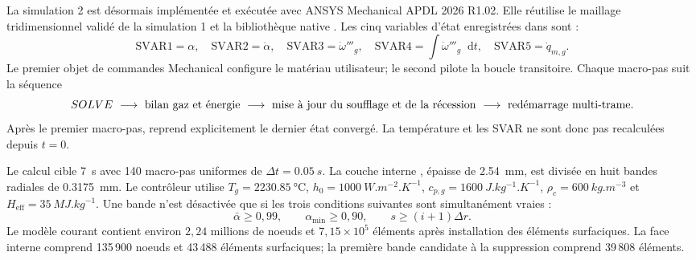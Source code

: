 \documentclass[oneside,openany]{amsdtx}
\newcommand{\dd}{\mathop{}\!\mathrm{d}}
\begin{document}
La simulation 2 est désormais implémentée et exécutée avec ANSYS Mechanical
APDL 2026 R1.02. Elle réutilise le maillage tridimensionnel validé de la
simulation 1 et la bibliothèque native . Les cinq variables
d'état enregistrées dans  sont :
\begin{equation}
  \mathrm{SVAR1}=\alpha,\quad
  \mathrm{SVAR2}=\dot\alpha,\quad
  \mathrm{SVAR3}=\dot\omega'''_g,\quad
  \mathrm{SVAR4}=\int\dot\omega'''_g\dd t,\quad
  \mathrm{SVAR5}=\dot q_{m,g}.
\end{equation}
Le premier objet de commandes Mechanical configure le matériau utilisateur; le
second pilote la boucle transitoire. Chaque macro-pas suit la séquence
\[
  \code{SOLVE}\ \longrightarrow\ \text{bilan gaz et énergie}\
  \longrightarrow\ \text{mise à jour du soufflage et de la récession}\
  \longrightarrow\ \text{redémarrage multi-trame}.
\]
Après le premier macro-pas,  reprend explicitement
le dernier état convergé. La température et les SVAR ne sont donc pas
recalculées depuis \(t=0\).

Le calcul cible \SI{7}{s} avec 140 macro-pas uniformes de
\(\Delta t=\SI{0.05}{s}\). La couche interne , épaisse de
\SI{2.54}{mm}, est divisée en huit bandes radiales de \SI{0.3175}{mm}. Le
contrôleur utilise \(T_g=\SI{2230.85}{\celsius}\),
\(h_0=\SI{1000}{W.m^{-2}.K^{-1}}\), \(c_{p,g}=\SI{1600}{J.kg^{-1}.K^{-1}}\),
\(\rho_c=\SI{600}{kg.m^{-3}}\) et
\(H_\mathrm{eff}=\SI{35}{MJ.kg^{-1}}\). Une bande n'est désactivée que si les
trois conditions suivantes sont simultanément vraies :
\[
  \bar\alpha\ge0{,}99,\qquad
  \alpha_\mathrm{min}\ge0{,}90,\qquad
  s\ge(i+1)\Delta r.
\]
Le modèle courant contient environ \(2{,}24\) millions de noeuds et
\(7{,}15\times10^5\) éléments après installation des éléments surfaciques.
La face interne comprend 135\,900 noeuds et 43\,488 éléments surfaciques; la
première bande candidate à la suppression comprend 39\,808 éléments.
\end{document}

